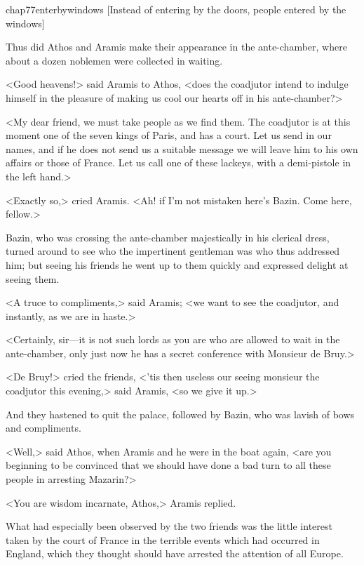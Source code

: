 \begin{bwbigpic}
	[\basicscale] 
	{chap77enterbywindows}
	[Instead of entering by the doors, people entered by the windows]
\end{bwbigpic}

Thus did Athos and Aramis make their appearance in the ante-chamber, where about a dozen noblemen were collected in waiting.

<Good heavens!> said Aramis to Athos, <does the coadjutor intend to indulge himself in the pleasure of making us cool our hearts off in his ante-chamber?>

<My dear friend, we must take people as we find them. The coadjutor is at this moment one of the seven kings of Paris, and has a court. Let us send in our names, and if he does not send us a suitable message we will leave him to his own affairs or those of France. Let us call one of these lackeys, with a demi-pistole in the left hand.>

<Exactly so,> cried Aramis. <Ah! if I'm not mistaken here's Bazin. Come here, fellow.>

Bazin, who was crossing the ante-chamber majestically in his clerical dress, turned around to see who the impertinent gentleman was who thus addressed him; but seeing his friends he went up to them quickly and expressed delight at seeing them.

<A truce to compliments,> said Aramis; <we want to see the coadjutor, and instantly, as we are in haste.>

<Certainly, sir—it is not such lords as you are who are allowed to wait in the ante-chamber, only just now he has a secret conference with Monsieur de Bruy.>

<De Bruy!> cried the friends, <'tis then useless our seeing monsieur the coadjutor this evening,> said Aramis, <so we give it up.>

And they hastened to quit the palace, followed by Bazin, who was lavish of bows and compliments.

<Well,> said Athos, when Aramis and he were in the boat again, <are you beginning to be convinced that we should have done a bad turn to all these people in arresting Mazarin?>

<You are wisdom incarnate, Athos,> Aramis replied.

What had especially been observed by the two friends was the little interest taken by the court of France in the terrible events which had occurred in England, which they thought should have arrested the attention of all Europe.

